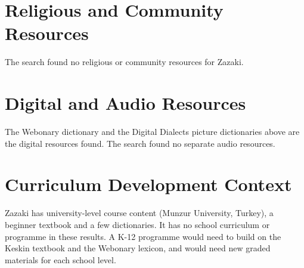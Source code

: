 \documentclass[12pt]{article}
\begin{document}
\section{Religious and Community Resources}
The search found no religious or community resources for Zazaki.

\section{Digital and Audio Resources}
The Webonary dictionary and the Digital Dialects picture dictionaries above are the digital resources found. The search found no separate audio resources.

\section{Curriculum Development Context}
Zazaki has university-level course content (Munzur University, Turkey), a beginner textbook and a few dictionaries. It has no school curriculum or programme in these results. A K-12 programme would need to build on the Keskin textbook and the Webonary lexicon, and would need new graded materials for each school level.
\end{document}
